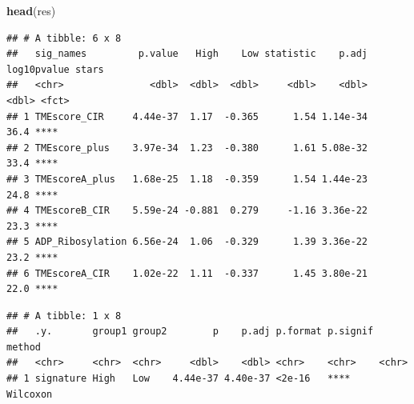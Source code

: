 \documentclass[
  12pt,
]{book}
\newenvironment{Shaded}{\begin{snugshade}}{\end{snugshade}}
\newcommand{\AttributeTok}[1]{\textcolor[rgb]{0.13,0.29,0.53}{#1}}
\newcommand{\ConstantTok}[1]{\textcolor[rgb]{0.56,0.35,0.01}{#1}}
\newcommand{\DecValTok}[1]{\textcolor[rgb]{0.00,0.00,0.81}{#1}}
\newcommand{\FunctionTok}[1]{\textcolor[rgb]{0.13,0.29,0.53}{\textbf{#1}}}
\newcommand{\NormalTok}[1]{#1}
\newcommand{\OtherTok}[1]{\textcolor[rgb]{0.56,0.35,0.01}{#1}}
\newcommand{\SpecialCharTok}[1]{\textcolor[rgb]{0.81,0.36,0.00}{\textbf{#1}}}
\newcommand{\StringTok}[1]{\textcolor[rgb]{0.31,0.60,0.02}{#1}}
\begin{document}
\begin{Shaded}
\begin{Highlighting}[]
\FunctionTok{head}\NormalTok{(res)}
\end{Highlighting}
\end{Shaded}

\begin{verbatim}
## # A tibble: 6 x 8
##   sig_names         p.value   High    Low statistic    p.adj log10pvalue stars
##   <chr>               <dbl>  <dbl>  <dbl>     <dbl>    <dbl>       <dbl> <fct>
## 1 TMEscore_CIR     4.44e-37  1.17  -0.365      1.54 1.14e-34        36.4 **** 
## 2 TMEscore_plus    3.97e-34  1.23  -0.380      1.61 5.08e-32        33.4 **** 
## 3 TMEscoreA_plus   1.68e-25  1.18  -0.359      1.54 1.44e-23        24.8 **** 
## 4 TMEscoreB_CIR    5.59e-24 -0.881  0.279     -1.16 3.36e-22        23.3 **** 
## 5 ADP_Ribosylation 6.56e-24  1.06  -0.329      1.39 3.36e-22        23.2 **** 
## 6 TMEscoreA_CIR    1.02e-22  1.11  -0.337      1.45 3.80e-21        22.0 ****
\end{verbatim}

\begin{Shaded}
\end{Shaded}

\begin{verbatim}
## # A tibble: 1 x 8
##   .y.       group1 group2        p    p.adj p.format p.signif method  
##   <chr>     <chr>  <chr>     <dbl>    <dbl> <chr>    <chr>    <chr>   
## 1 signature High   Low    4.44e-37 4.40e-37 <2e-16   ****     Wilcoxon
\end{verbatim}
\end{document}
